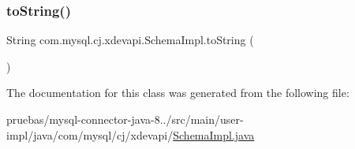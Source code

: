 \subsubsection{\texorpdfstring{to\+String()}{toString()}}
{\footnotesize\ttfamily String com.\+mysql.\+cj.\+xdevapi.\+Schema\+Impl.\+to\+String (\begin{DoxyParamCaption}{ }\end{DoxyParamCaption})}



The documentation for this class was generated from the following file\+:\begin{DoxyCompactItemize}
\item 
pruebas/mysql-\/connector-\/java-\/8../src/main/user-\/impl/java/com/mysql/cj/xdevapi/\mbox{\hyperlink{_schema_impl_8java}{Schema\+Impl.\+java}}\end{DoxyCompactItemize}

